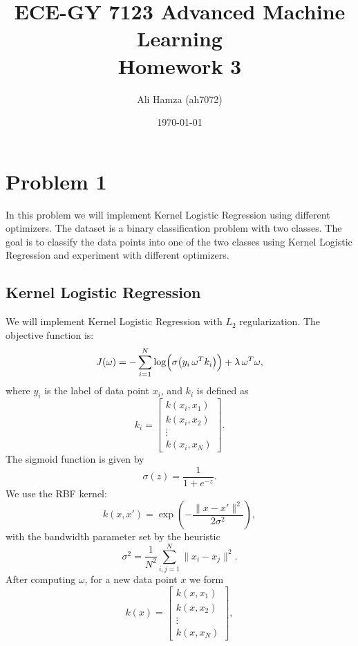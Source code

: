 \documentclass{article}
\title{ECE-GY 7123 Advanced Machine Learning \\ \Large Homework 3}
\author{Ali Hamza (ah7072)}
\date{\today}
\begin{document}
\maketitle
\tableofcontents
\newpage
\section{Problem 1}
In this problem we will implement Kernel Logistic Regression using different optimizers. The dataset is a binary classification problem with two classes. The goal is to classify the data points into one of the two classes using Kernel Logistic Regression and experiment with different optimizers. 
\subsection{Kernel Logistic Regression}
We will implement Kernel Logistic Regression with \(L_2\) regularization. The objective function is:
\begin{equation}
    J(\omega) = -\sum_{i=1}^{N} \log\Bigl(\sigma\bigl(y_i\,\omega^T k_i\bigr)\Bigr) + \lambda\, \omega^T\omega,
\end{equation}
where \(y_i\) is the label of data point \(x_i\), and \(k_i\) is defined as
\begin{equation}
    k_i = \begin{bmatrix} k(x_i, x_1) \\ k(x_i, x_2) \\ \vdots \\ k(x_i, x_N) \end{bmatrix}.
\end{equation}
The sigmoid function is given by
\begin{equation}
    \sigma(z) = \frac{1}{1 + e^{-z}}.
\end{equation}
We use the RBF kernel:
\begin{equation}
    k(x, x') = \exp\!\left(-\frac{\|x - x'\|^2}{2\sigma^2}\right),
\end{equation}
with the bandwidth parameter set by the heuristic
\begin{equation}
    \sigma^2 = \frac{1}{N^2} \sum_{i,j=1}^{N}\|x_i - x_j\|^2.
\end{equation}
  After computing \(\omega\), for a new data point \(x\) we form
\begin{equation}
    k(x) = \begin{bmatrix} k(x, x_1) \\ k(x, x_2) \\ \vdots \\ k(x, x_N) \end{bmatrix},
\end{equation}
\end{document}
